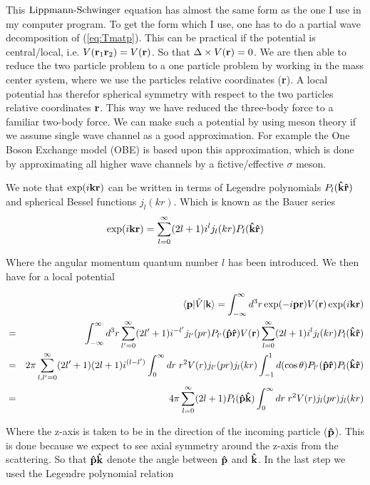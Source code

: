 This $\text{Lippmann-Schwinger}$ equation has almost the same form as the one I use in my computer program.
To get the form which 
I use, one has to do a partial wave decomposition of (\ref{eq:Tmatp}). 
This can be practical if the potential is central/local, i.e.        %
$V({\bf r}_1{\bf r}_2)=V({\bf r})$. So that $\Delta\times V({\bf r})=0$.
We are then able to reduce the two particle problem to a one particle problem by
working in the mass center system, where we use the particles relative coordinates ({\bf r}). 
A local potential has therefor spherical symmetry
with respect to the two particles relative coordinates ${\bf r}$.
This way we have reduced the three-body force to a familiar two-body force.
We can make such a potential by using
meson theory if we assume single wave channel as a good approximation. For example the 
One Boson Exchange model (OBE) is based upon this approximation, which is done by approximating all
higher wave channels by a fictive/effective $\sigma$ meson.


We note that $\exp (i{\bf kr})$ can be written in terms of Legendre polynomials 
$P_l({\bf \hat{k}\hat{r}})$ and spherical Bessel functions $j_l ({ kr})$. Which is known as the 
Bauer series
%
\begin{equation}
\exp (i{\bf kr})=\sum^{\infty}_{l=0} (2l+1) i^{l} j_{l}(kr)P_l({\bf \hat{k}\hat{r}})
\end{equation}

Where the angular momentum quantum number $l$ has been introduced. We then have
for a local potential
%
\begin{flushleft} 
\begin{eqnarray}
&&\langle{{\bf p}}|{\hat{V}}|{\bf k}\rangle =\int^{\infty}_{-\infty}d^3r
\exp (-i{\bf pr})V({\bf r})\exp (i{\bf kr})\nonumber\\
&=&
\int^{\infty}_{-\infty}d^3r
\sum^{\infty}_{l'=0} (2l'+1) i^{-l'} j_{l'}(pr)P_{l'}({\bf \hat{p}\hat{r}}) V({\bf r})
\sum^{\infty}_{l=0} (2l+1) i^{l} j_{l}(kr)P_l({\bf \hat{k}\hat{r}})\nonumber\\ 
&=&
2\pi\sum^{\infty}_{l,l'=0}(2l'+1)(2l+1) i^{(l-l')}
\int^{\infty}_{0}dr\;r^2 V(r) j_{l'}(pr)j_{l}(kr) \int^{1}_{-1}d({\cos \theta}) 
P_{l'}({\bf \hat{p}\hat{r}})P_l({\bf \hat{k}\hat{r}})\nonumber\\
&=&
4\pi\sum^{\infty}_{l=0} (2l+1) P_{l}({\bf \hat{p}\hat{k}})
\int^{\infty}_{0}dr\;r^2 V(r) j_{l}(pr)j_{l}(kr) 
\end{eqnarray}
\end{flushleft} 
%
Where the z-axis is taken to be in the direction of the incoming particle (${\bf \hat{p}}$).
This is done because we expect to see axial symmetry around the z-axis from the scattering. So 
that ${\bf \hat{p}\hat{k}}$ denote the angle between ${\bf \hat{p}}$ and ${\bf \hat{k}}$.
In the last step we used the Legendre polynomial relation

